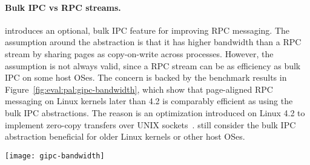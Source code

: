 \paragraph{Bulk IPC vs RPC streams.}
\Thehostabi{} introduces an optional, bulk IPC feature for improving RPC messaging.
The assumption around the
abstraction
is that it has higher bandwidth
than a RPC stream
by sharing pages as copy-on-write across processes.
However,
the assumption is not always valid, since a RPC stream
can be as efficiency as bulk IPC on some host OSes.
The concern is backed by the benchmark results in Figure~\ref{fig:eval:pal:gipc-bandwidth},
which show that
page-aligned RPC messaging on Linux kernels later than 4.2
is comparably efficient
as using the bulk IPC abstractions.
The reason is an optimization introduced on Linux 4.2
to implement zero-copy transfers
over UNIX sockets~\cite{linux4.2-unix}.
\graphene{} still consider the bulk IPC abstraction
beneficial for older Linux kernels
or other host OSes. 



\begin{figure*}[t!]
\centering
\footnotesize
\texttt{[image: gipc-bandwidth]}
\caption{Bandwidth of sending large messages over (a) RPC streams and (b) Bulk IPC channels. The messages are sent in different sizes (1MB to 256MB), and either aligned or unaligned with the page boundary.
Higher is better. Both abstractions are benchmarked on Linux kernel 3.19 and 4.10 as the hosts. The impact of the \seccomp{} filter or reference monitor is marginal (less than 1\%).}
\label{fig:eval:pal:gipc-bandwidth}
\end{figure*}


 




